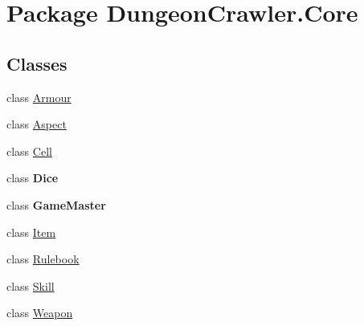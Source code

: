 \hypertarget{namespace_dungeon_crawler_1_1_core}{}\section{Package Dungeon\+Crawler.\+Core}
\label{namespace_dungeon_crawler_1_1_core}
\subsection*{Classes}
\begin{DoxyCompactItemize}
\item 
class \hyperlink{class_dungeon_crawler_1_1_core_1_1_armour}{Armour}
\item 
class \hyperlink{class_dungeon_crawler_1_1_core_1_1_aspect}{Aspect}
\item 
class \hyperlink{class_dungeon_crawler_1_1_core_1_1_cell}{Cell}
\item 
class {\bfseries Dice}
\item 
class {\bfseries Game\+Master}
\item 
class \hyperlink{class_dungeon_crawler_1_1_core_1_1_item}{Item}
\item 
class \hyperlink{class_dungeon_crawler_1_1_core_1_1_rulebook}{Rulebook}
\item 
class \hyperlink{class_dungeon_crawler_1_1_core_1_1_skill}{Skill}
\item 
class \hyperlink{class_dungeon_crawler_1_1_core_1_1_weapon}{Weapon}
\end{DoxyCompactItemize}
